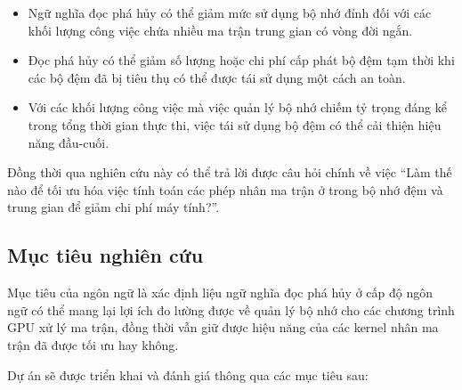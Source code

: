 \documentclass[a4paper]{article}
\begin{document}
	\begin{itemize}
		\item Ngữ nghĩa đọc phá hủy có thể giảm mức sử dụng bộ nhớ đỉnh đối với các khối lượng công việc chứa nhiều ma trận trung gian có vòng đời ngắn.
		\item Đọc phá hủy có thể giảm số lượng hoặc chi phí cấp phát bộ đệm tạm thời khi các bộ đệm đã bị tiêu thụ có thể được tái sử dụng một cách an toàn.
		\item Với các khối lượng công việc mà việc quản lý bộ nhớ chiếm tỷ trọng đáng kể trong tổng thời gian thực thi, việc tái sử dụng bộ đệm có thể cải thiện hiệu năng đầu-cuối.
	\end{itemize}
	
	Đồng thời qua nghiên cứu này có thể trả lời được câu hỏi chính về việc ``Làm thế nào để tối ưu hóa việc tính toán các phép nhân ma trận ở trong bộ nhớ đệm và trung gian để giảm chi phí máy tính?''.
	
	\subsection{Mục tiêu nghiên cứu}
	
	Mục tiêu của ngôn ngữ là xác định liệu ngữ nghĩa đọc phá hủy ở cấp độ ngôn ngữ có thể mang lại lợi ích đo lường được về quản lý bộ nhớ cho các chương trình GPU xử lý ma trận, đồng thời vẫn giữ được hiệu năng của các kernel nhân ma trận đã được tối ưu hay không.
	
	Dự án sẽ được triển khai và đánh giá thông qua các mục tiêu sau:
	
\end{document}
